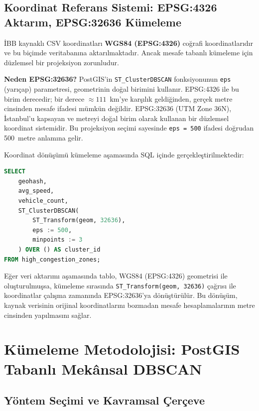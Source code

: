 \documentclass[12pt,a4paper]{article}
\begin{document}
\subsection{Koordinat Referans Sistemi: EPSG:4326 Aktarım, EPSG:32636 Kümeleme}

İBB kaynaklı CSV koordinatları \textbf{WGS84 (EPSG:4326)} coğrafi koordinatlarıdır ve bu biçimde veritabanına aktarılmaktadır. Ancak mesafe tabanlı kümeleme için düzlemsel bir projeksiyon zorunludur.

\textbf{Neden EPSG:32636?} PostGIS'in \texttt{ST\_ClusterDBSCAN} fonksiyonunun \texttt{eps} (yarıçap) parametresi, geometrinin doğal birimini kullanır. EPSG:4326 ile bu birim derecedir; bir derece $\approx 111$~km'ye karşılık geldiğinden, gerçek metre cinsinden mesafe ifadesi mümkün değildir. EPSG:32636 (UTM Zone 36N), İstanbul'u kapsayan ve metreyi doğal birim olarak kullanan bir düzlemsel koordinat sistemidir. Bu projeksiyon seçimi sayesinde \texttt{eps = 500} ifadesi doğrudan 500~metre anlamına gelir.

Koordinat dönüşümü kümeleme aşamasında SQL içinde gerçekleştirilmektedir:

\begin{lstlisting}[language=SQL, caption={EPSG:4326 -> EPSG:32636 dönüşümü ve ST\_ClusterDBSCAN}]
SELECT
    geohash,
    avg_speed,
    vehicle_count,
    ST_ClusterDBSCAN(
        ST_Transform(geom, 32636),
        eps := 500,
        minpoints := 3
    ) OVER () AS cluster_id
FROM high_congestion_zones;
\end{lstlisting}

\begin{notebox}
Eğer veri aktarımı aşamasında tablo, WGS84 (EPSG:4326) geometrisi ile oluşturulmuşsa, kümeleme sırasında \texttt{ST\_Transform(geom, 32636)} çağrısı ile koordinatlar çalışma zamanında EPSG:32636'ya dönüştürülür. Bu dönüşüm, kaynak verisinin orijinal koordinatlarını bozmadan mesafe hesaplamalarının metre cinsinden yapılmasını sağlar.
\end{notebox}

\section{Kümeleme Metodolojisi: PostGIS Tabanlı Mekânsal DBSCAN}

\subsection{Yöntem Seçimi ve Kavramsal Çerçeve}
\end{document}
